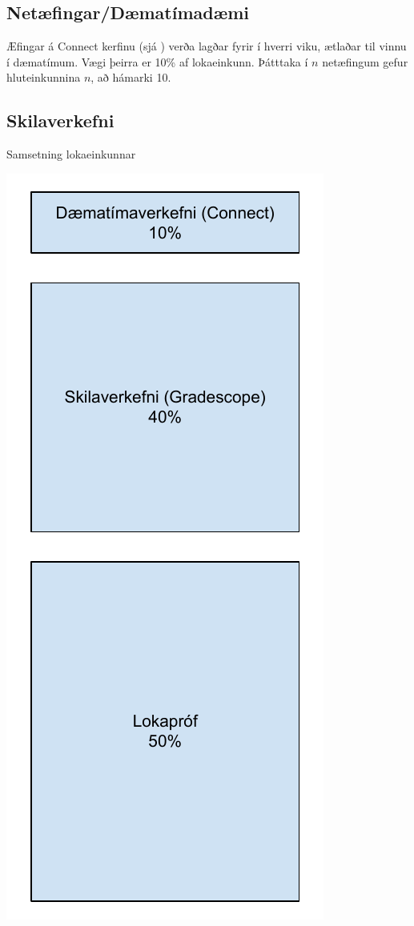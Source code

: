 \documentclass[justified, nobib]{tufte-handout}
\begin{document}
\subsection{Netæfingar/Dæmatímadæmi}
Æfingar á Connect kerfinu (sjá ) verða lagðar fyrir í hverri viku, ætlaðar til vinnu í dæmatímum. Vægi þeirra er 10\% af lokaeinkunn. Þátttaka í $n$ netæfingum gefur hluteinkunnina $n$, að hámarki 10.

\subsection{Skilaverkefni}
\begin{marginfigure}
    \caption{Samsetning lokaeinkunnar}
    \includegraphics[width=\linewidth]{Pics/namsmat}

\end{marginfigure}
\end{document}
